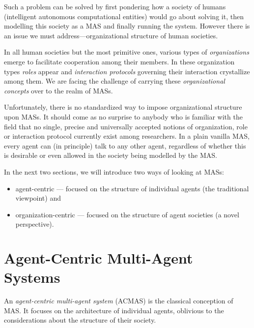 Such a problem can be solved by first pondering how a society of humans (intelligent autonomous computational entities) would go about solving it, then modelling this society as a MAS and finally running the system.
However there is an issue we must address---organizational structure of human societies.

In all human societies but the most primitive ones, various types of \textit{organizations} emerge to facilitate cooperation among their members.
In these organization types \textit{roles} appear and \textit{interaction protocols} governing their interaction crystallize among them.
We are facing the challenge of carrying these \textit{organizational concepts} over to the realm of MASs.

Unfortunately, there is no standardized way to impose organizational structure upon MASs.
It should come as no surprise to anybody who is familiar with the field that no single, precise and universally accepted notions of organization, role or interaction protocol currently exist among researchers.
In a plain vanilla MAS, every agent can (in principle) talk to any other agent, regardless of whether this is desirable or even allowed in the society being modelled by the MAS.

In the next two sections, we will introduce two ways of looking at MASs:
\begin{itemize}
	\item agent-centric --- focused on the structure of individual agents (the traditional viewpoint) and
	\item organization-centric --- focused on the structure of agent societies (a novel perspective).
\end{itemize}

\section{Agent-Centric Multi-Agent Systems}

An \textit{agent-centric multi-agent system} (ACMAS) is the classical conception of MAS.
It focuses on the architecture of individual agents, oblivious to the considerations about the structure of their society.

